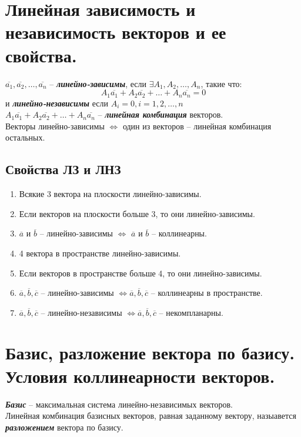 \documentclass[12pt, fleqn]{article}
\begin{document}
\section{Линейная зависимость и независимость векторов и ее свойства.}
$\overline{a_1}, \overline{a_2}, \dots, \overline{a_n}$ -- \textbf{\textit{линейно-зависимы}}, если $\exists A_1, A_2, \dots, A_n$, такие что:\\
$$A_1\overline{a_1}+A_2\overline{a_2}+\dots+A_n\overline{a_n} = 0$$
и \textbf{\textit{линейно-независимы}} если $A_i = 0, i=1,2,\dots,n$\\
$A_1\overline{a_1}+A_2\overline{a_2}+\dots+A_n\overline{a_n}$ -- \textbf{\textit{линейная комбинация}} векторов.\\
Векторы линейно-зависимы $\Leftrightarrow$ один из векторов -- линейная комбинация остальных.\\
\subsection*{Свойства ЛЗ и ЛНЗ}
\begin{enumerate}
	\item Всякие 3 вектора на плоскости линейно-зависимы.
	\item Если векторов на плоскости больше 3, то они линейно-зависимы.
	\item $\overline{a}$ и $\overline{b}$ -- линейно-зависимы $\Leftrightarrow$ $\overline{a}$ и $\overline{b}$ -- коллинеарны.
	\item 4 вектора в пространстве линейно-зависимы.
	\item Если векторов в пространстве больше 4, то они линейно-зависимы.
	\item $\overline{a}, \overline{b}, \overline{c}$ -- линейно-зависимы $\Leftrightarrow \overline{a}, \overline{b}, \overline{c}$ -- коллинеарны в пространстве.
	\item $\overline{a}, \overline{b}, \overline{c}$ -- линейно-независимы  $\Leftrightarrow \overline{a}, \overline{b}, \overline{c}$ -- некомпланарны.
\end{enumerate}
\section{Базис, разложение вектора по базису. Условия коллинеарности векторов.}
\textbf{\textit{Базис}} -- максимальная система линейно-независимых векторов.\\
Линейная комбинация базисных векторов, равная заданному вектору, назыавется \textbf{\textit{разложением}} вектора по базису.
\end{document}

